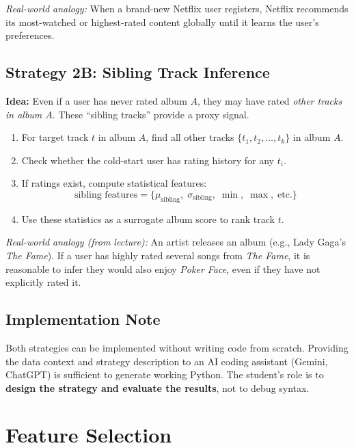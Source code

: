 \documentclass[11pt]{article}
\begin{document}
\textit{Real-world analogy:} When a brand-new Netflix user registers, Netflix recommends its most-watched or highest-rated content globally until it learns the user's preferences.

\subsection{Strategy 2B: Sibling Track Inference}
\textbf{Idea:} Even if a user has never rated album $A$, they may have rated \emph{other tracks in album $A$}.
These ``sibling tracks'' provide a proxy signal.

\begin{enumerate}
    \item For target track $t$ in album $A$, find all other tracks $\{t_1, t_2, \ldots, t_k\}$ in album $A$.
    \item Check whether the cold-start user has rating history for any $t_i$.
    \item If ratings exist, compute statistical features:
    \[
        \text{sibling features} = \{\mu_\text{sibling},\; \sigma_\text{sibling},\; \min,\; \max,\; \text{etc.}\}
    \]
    \item Use these statistics as a surrogate album score to rank track $t$.
\end{enumerate}

\textit{Real-world analogy (from lecture):} An artist releases an album (e.g., Lady Gaga's \textit{The Fame}).
If a user has highly rated several songs from \textit{The Fame}, it is reasonable to infer they would also enjoy \textit{Poker Face}, even if they have not explicitly rated it.

\subsection{Implementation Note}
Both strategies can be implemented without writing code from scratch.
Providing the data context and strategy description to an AI coding assistant (Gemini, ChatGPT) is sufficient to generate working Python.
The student's role is to \textbf{design the strategy and evaluate the results}, not to debug syntax.


\section{Feature Selection}
\label{sec:feature_selection}
\end{document}
